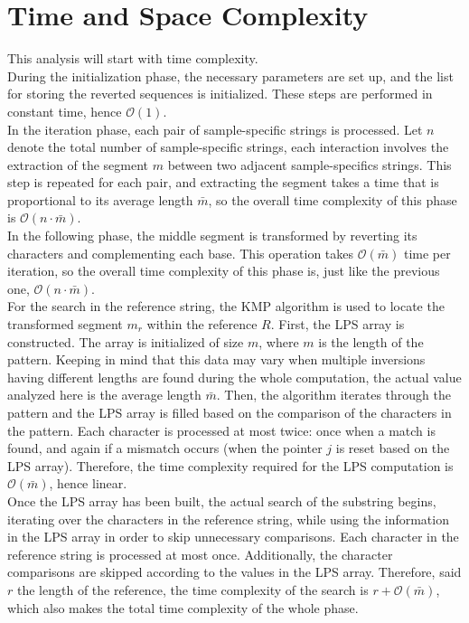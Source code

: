 \section{Time and Space Complexity}
This analysis will start with time complexity. \\
During the initialization phase, the necessary parameters are set up, and the list for storing the reverted sequences is initialized. These steps are performed in constant time, hence $\mathcal{O}(1)$. \\

In the iteration phase, each pair of sample-specific strings is processed. Let \( n \) denote the total number of sample-specific strings, each interaction involves the extraction of the segment \( m \) between two adjacent sample-specifics strings. This step is repeated for each pair, and extracting the segment takes a time that is proportional to its average length $\bar{m}$, so the overall time complexity of this phase is $\mathcal{O}(n \cdot \bar{m} )$. \\

In the following phase, the middle segment is transformed by reverting its characters and complementing each base. This operation takes $\mathcal{O}( \bar{m})$ time per iteration, so the overall time complexity of this phase is, just like the previous one, $\mathcal{O}(n \cdot \bar{m} )$. \\

For the search in the reference string, the KMP algorithm is used to locate the transformed segment \( m_r \) within the reference \( R \). First, the LPS array is constructed. The array is initialized of size \( m \), where \( m \) is the length of the pattern. Keeping in mind that this data may vary when multiple inversions having different lengths are found during the whole computation, the actual value analyzed here is the average length \( \bar{m} \).  Then, the algorithm iterates through the pattern and the LPS array is filled based on the comparison of the characters in the pattern. Each character is processed at most twice: once when a match is found, and again if a mismatch occurs (when the pointer \( j \) is reset based on the LPS array). Therefore, the time complexity required for the LPS computation is $\mathcal{O}(\bar{m})$, hence linear. \\
Once the LPS array has been built, the actual search of the substring begins, iterating over the characters in the reference string, while using the information in the LPS array in order to skip unnecessary comparisons. Each character in the reference string is processed at most once. Additionally, the character comparisons are skipped according to the values in the LPS array. Therefore, said \( r \) the length of the reference, the time complexity of the search is  $r + \mathcal{O}(\bar{m})$, which also makes the total time complexity of the whole phase. \\

